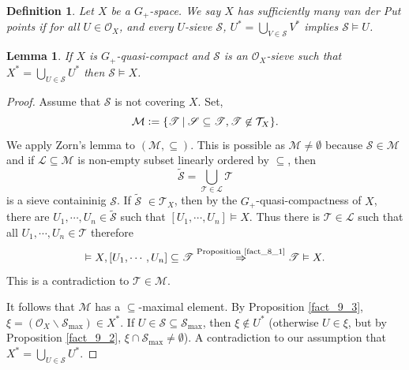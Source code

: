 \documentclass[8pt]{article}
\numberwithin{equation}{section}
\newtheorem{definition}{Definition}[subsection]
\newtheorem{lemma}{Lemma}[subsection]
\newtheorem{remark}{Remark}[subsection]
\newcommand{\defeq}{\vcentcolon=}
\newcommand{\Ouv}{\mathscr{O}}
\newcommand{\sep}[0]{\:|\:}
\newcommand{\sS}[0]{\mathscr{S}}
\begin{document}

\begin{definition}
    \label{definition_10_10}
    Let $X$ be a $G_+$-space. We say $X$ has sufficiently many van der Put points if for all $U\in\Ouv_X$, and every $U$-sieve $\sS$, $U^*=\bigcup_{V\in\sS}V^*$ implies $\sS\vDash U$. 
\end{definition}


\begin{lemma}
    \label{lemma_10_1}
    If $X$ is $G_+$-quasi-compact and $\sS$ is an $\Ouv_X$-sieve such that $X^*=\bigcup_{U\in\sS}U^*$ then $\sS \vDash X$.
\end{lemma}

\begin{proof}
    Assume that $\sS$ is not covering $X$. Set,
    \begin{equation*}
    \mathcal{M} \defeq\{\mathscr{T}\sep \sS\subseteq\mathscr{T},\mathscr{T}\not\in\mathcal{T}_X\}.
    \end{equation*}
    We apply Zorn's lemma to $(\mathcal{M},\subseteq)$. This is possible as $\mathcal{M}\not=\emptyset$ because $\sS\in\mathcal{M}$ and if $\mathcal{L}\subseteq\mathcal{M}$ is non-empty subset linearly ordered by $\subseteq$, then 
    \begin{equation*}
    \widetilde{\sS}=\bigcup_{\mathscr{T}\in\mathcal{L}}\mathscr{T}
    \end{equation*}
    is a sieve containinig $\sS$. If $\widetilde{\sS}$ $\in\mathcal{T}_X$, then by the $G_+$-quasi-compactness of $X$, there are $U_1,\cdots,U_n\in\widetilde{\sS}$ such that $[U_1,\cdots,U_n]\vDash X$. Thus there is $\mathscr{T}\in\mathcal{L}$ such that all $U_1,\cdots, U_n\in\mathscr{T}$ therefore 
    \begin{equation*}
    [U_1,\cdots,U_n]\vDash X,[U_1,\cdots,U_n]\subseteq\mathscr{T}\stackrel{\text{Proposition \ref{fact_8_1}}}{\Rightarrow}\mathscr{T}\vDash X.
    \end{equation*}
    This is a contradiction to $\mathscr{T}\in\mathcal{M}$.
    \par It follows that $\mathcal{M}$ has a $\subseteq$-maximal element. By Proposition \ref{fact_9_3}, $\xi=(\Ouv_X\backslash\sS_{\max})\in X^*$. If $U\in\sS\subseteq\sS_{\max}$, then $\xi\not\in U^*$ (otherwise $U\in\xi$, but by Proposition \ref{fact_9_2}, $\xi\cap\sS_{\max}\not=\emptyset$). A contradiction to our assumption that $X^*=\bigcup_{U\in\sS}U^*$.
\end{proof}
\end{document}
